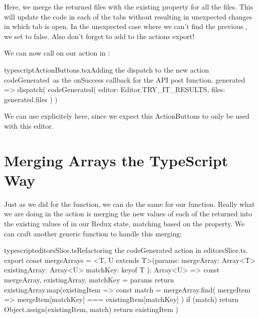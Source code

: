\documentclass[a4paper,headinclude=on,footinclude=on,12pt,oneside]{scrbook}
\begin{document}
Here, we merge the returned files with the existing  property for all the files. This will update the code in each of the tabs without resulting in unexpected changes in which tab is open. In the unexpected case where we can't find the previous , we set  to false. Also don't forget to add  to the actions export!


We can now call  on our  action in :

\begin{codeInput}{typescript}{ActionButtons.tsx}{Adding the dispatch to the new action codeGenerated\, as the onSuccess callback for the API post function.}
generated => {
  dispatch(
    codeGenerated({
      editor: Editor.TRY_IT_RESULTS,
      files: generated.files
    })
  )
}
\end{codeInput}

We can use  explicitely here, since we expect this ActionButtons to only be used with this editor.

\section{Merging Arrays the TypeScript Way}

Just as we did for the  function, we can  do the same for our  function. Really what we are doing in the  action is merging the new values of each of the returned  into the existing values of  in our Redux state, matching based on the  property. We can craft another generic function to handle this merging:

\begin{codeInput}{typescript}{editorsSlice.ts}{Refactoring the codeGenerated action in editorsSlice.ts.}
export const mergeArrays = <T, U extends T>(params: {
  mergeArray: Array<T>
  existingArray: Array<U>
  matchKey: keyof T
}): Array<U> => {
  const { mergeArray, existingArray, matchKey } = params
  return existingArray.map(existingItem => {
    const match = mergeArray.find(
      mergeItem => mergeItem[matchKey] === existingItem[matchKey]
    )
    if (match) {
      return Object.assign(existingItem, match)
    }
    return existingItem
  })
}  
\end{codeInput}
\end{document}
